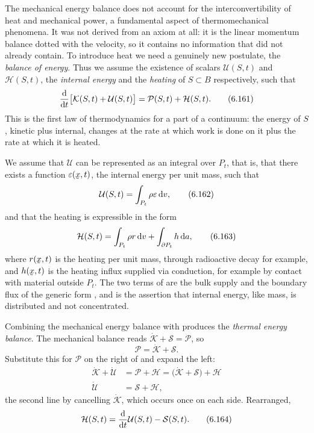 The mechanical energy balance  does not account for the
interconvertibility of heat and mechanical power, a fundamental aspect
of thermomechanical phenomena. It was not derived from an axiom at all:
it is the linear momentum balance dotted with the velocity, so it
contains no information that  did not already contain. To
introduce heat we need a genuinely new postulate, the \emph{balance of
energy}. Thus we assume the existence of scalars $\mathcal{U}(S,t)$ and
$\mathcal{H}(S,t)$, the \emph{internal energy} and the \emph{heating}
of $S\subset B$ respectively, such that
\begin{equation}
   \frac{\mathrm{d}}{\mathrm{d} t}\big[\mathcal{K}(S,t)+\mathcal{U}(S,t)\big]
   =\mathcal{P}(S,t)+\mathcal{H}(S,t).
   \tag{6.161}\label{eq:6.161}
\end{equation}
This is the first law of thermodynamics for a part of a continuum: the
energy of $S$, kinetic plus internal, changes at the rate at which work
is done on it plus the rate at which it is heated.

We assume that $\mathcal{U}$ can be represented as an integral over
$P_{t}$, that is, that there exists a function $\eps(\bx,t)$, the
internal energy per unit mass, such that
\begin{equation}
   \mathcal{U}(S,t)=\int_{P_{t}}\rho\varepsilon\,\mathrm{d} v ,
   \tag{6.162}\label{eq:6.162}
\end{equation}
and that the heating is expressible in the form
\begin{equation}
   \mathcal{H}(S,t)=\int_{P_{t}}\rho r\,\mathrm{d} v
   +\int_{\partial P_{t}}h\,\mathrm{d} a ,
   \tag{6.163}\label{eq:6.163}
\end{equation}
where $r(\bx,t)$ is the heating per unit mass, through radioactive
decay for example, and $h(\bx,t)$ is the heating influx supplied via
conduction, for example by contact with material outside $P_{t}$. The
two terms of  are the bulk supply and the boundary flux of
the generic form , and  is the assertion that
internal energy, like mass, is distributed and not concentrated.


Combining the mechanical energy balance with  produces the
\emph{thermal energy balance}. The mechanical balance  reads
$\dot{\mathcal{K}}+\mathcal{S}=\mathcal{P}$, so
\[
   \mathcal{P}=\dot{\mathcal{K}}+\mathcal{S} .
\]
Substitute this for $\mathcal{P}$ on the right of  and
expand the left:
\[
\begin{aligned}
   \dot{\mathcal{K}}+\dot{\mathcal{U}}
   &=\mathcal{P}+\mathcal{H}
   =\big(\dot{\mathcal{K}}+\mathcal{S}\big)+\mathcal{H}\\
   \dot{\mathcal{U}}&=\mathcal{S}+\mathcal{H} ,
\end{aligned}
\]
the second line by cancelling $\dot{\mathcal{K}}$, which occurs once on
each side. Rearranged,
\begin{equation}
   \mathcal{H}(S,t)=\frac{\mathrm{d}}{\mathrm{d} t}\mathcal{U}(S,t)-\mathcal{S}(S,t).
   \tag{6.164}\label{eq:6.164}
\end{equation}

